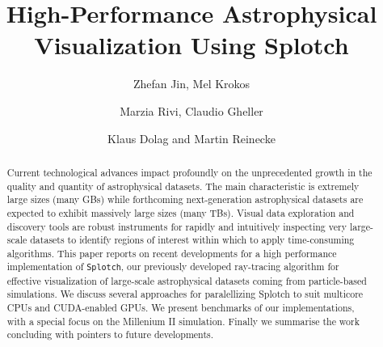 

\title{High-Performance Astrophysical Visualization Using Splotch}


\author{Zhefan Jin, Mel Krokos}
\address{School of Creative Technologies, University of Portsmouth, Winston Churchill Avenue, Portsmouth, United Kingdom}

\author{Marzia Rivi, Claudio Gheller}
\address{CINECA, Via Magnanelli 6/3, Casalecchio di Reno, Italy}

\author{Klaus Dolag and Martin Reinecke}
\address{Max-Planck-Institut f\"ur Astrophysik, Karl-Schwarzschild Strasse 1, Garching bei M\"unchen, Germany}

%
%

\begin{abstract}

Current technological advances impact profoundly on the unprecedented growth 
in the quality and quantity of astrophysical datasets. The main characteristic 
is extremely large sizes (many GBs) while forthcoming next-generation astrophysical 
datasets are expected to exhibit massively large sizes (many TBs). Visual data 
exploration and discovery tools are robust instruments for rapidly and intuitively 
inspecting very large-scale datasets to identify regions of interest within 
which to apply time-consuming algorithms.  This paper reports on recent developments 
for a high performance implementation of {\tt Splotch}, our previously developed 
ray-tracing algorithm for effective visualization of large-scale astrophysical 
datasets coming from particle-based simulations. We discuss several approaches for 
paralellizing Splotch to suit multicore CPUs and CUDA-enabled GPUs. 
We present benchmarks of our implementations, with a special focus on the 
Millenium II simulation. Finally we summarise the work concluding with pointers 
to future developments.

\end{abstract}

